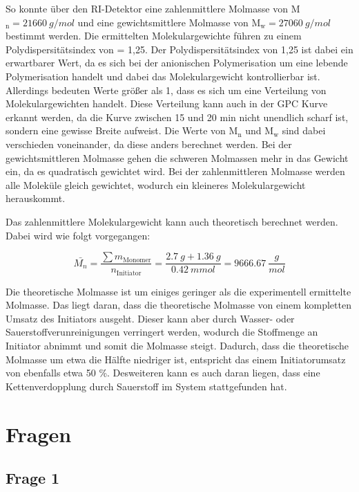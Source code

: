 \documentclass[10pt,a4paper,ngerman]{scrartcl}
\begin{document}
	So konnte über den RI-Detektor eine zahlenmittlere Molmasse von M$_\text{n} = \SI{21660}{g/mol}$ und eine gewichtsmittlere Molmasse von 
	M$_\text{w} = \SI{27060}{g/mol}$ bestimmt werden. Die ermittelten Molekulargewichte führen zu einem Polydispersitätsindex von \DH = 1,25. 
	Der Polydispersitätsindex von 1,25 ist dabei ein erwartbarer Wert, da es sich bei der anionischen Polymerisation um eine lebende Polymerisation 
	handelt und dabei das Molekulargewicht kontrollierbar ist. Allerdings bedeuten Werte größer als 1, dass es sich um eine Verteilung von 
	Molekulargewichten handelt. Diese Verteilung kann auch in der GPC Kurve erkannt werden, da die Kurve zwischen 15 und 20 min nicht unendlich 
	scharf ist, sondern eine gewisse Breite aufweist. Die Werte von M$_\text{n}$ und M$_\text{w}$ sind dabei verschieden voneinander, da diese 
	anders berechnet werden. Bei der gewichtsmittleren Molmasse gehen die schweren Molmassen mehr in das Gewicht ein, da es quadratisch gewichtet wird. 
	Bei der zahlenmittleren Molmasse werden alle Moleküle gleich gewichtet, wodurch ein kleineres Molekulargewicht herauskommt.

	
	Das zahlenmittlere Molekulargewicht kann auch theoretisch berechnet werden.
	Dabei wird wie folgt vorgegangen:

		\begin{equation}
			\bar{M_n} = \frac{\sum m_\text{Monomer}}{n_\text{Initiator}} = \frac{\SI{2,7}{g} + \SI{1.36}{g}}{\SI{0.42}{mmol}} = \SI{9666,67}{\frac{g}{mol}} 
		\end{equation}

	Die theoretische Molmasse ist um einiges geringer als die experimentell ermittelte Molmasse. 
	Das liegt daran, dass die theoretische Molmasse von einem kompletten Umsatz des Initiators ausgeht. Dieser kann aber durch Wasser- oder 
	Sauerstoffverunreinigungen verringert werden, wodurch die Stoffmenge an Initiator abnimmt und somit die Molmasse steigt. Dadurch, dass 
	die theoretische Molmasse um etwa die Hälfte niedriger ist, entspricht das einem Initiatorumsatz von ebenfalls etwa 50 \%.
	Desweiteren kann es auch daran liegen, dass eine Kettenverdopplung durch Sauerstoff im System stattgefunden hat.


\section{Fragen}

	\subsection{Frage 1}
\end{document}
